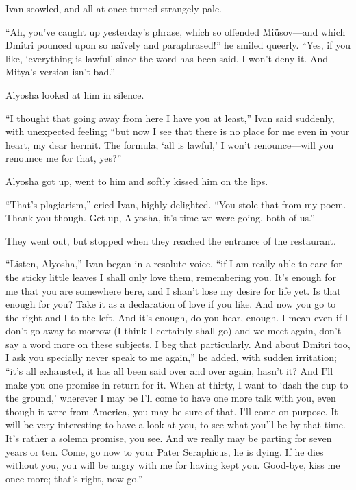 Ivan scowled, and all at once turned strangely pale.

``Ah, you've caught up yesterday's phrase, which so offended
Mi\"{u}sov---and which Dmitri pounced upon so na\"{i}vely and
paraphrased!'' he smiled queerly. ``Yes, if you like, `everything is
lawful' since the word has been said. I won't deny it. And Mitya's
version isn't bad.''

Alyosha looked at him in silence.

``I thought that going away from here I have you at least,'' Ivan said
suddenly, with unexpected feeling; ``but now I see that there is no
place for me even in your heart, my dear hermit. The formula, `all is
lawful,' I won't re\-nounce---will you renounce me for that, yes?''

Alyosha got up, went to him and softly kissed him on the lips.

``That's plagiarism,'' cried Ivan, highly delighted. ``You stole that
from my poem. Thank you though. Get up, Alyosha, it's time we were
going, both of us.''

They went out, but stopped when they reached the entrance of the
restaurant.

``Listen, Alyosha,'' Ivan began in a resolute voice, ``if I am really
able to care for the sticky little leaves I shall only love them,
remembering you. It's enough for me that you are somewhere here, and I
shan't lose my desire for life yet. Is that enough for you? Take it as
a declaration of love if you like. And now you go to the right and I
to the left. And it's enough, do you hear, enough. I mean even if I
don't go away to-morrow (I think I certainly shall go) and we meet
again, don't say a word more on these subjects. I beg that
particularly. And about Dmitri too, I ask you specially never speak to
me again,'' he added, with sudden irritation; ``it's all exhausted, it
has all been said over and over again, hasn't it? And I'll make you
one promise in return for it. When at thirty, I want to `dash the cup
to the ground,' wherever I may be I'll come to have one more talk with
you, even though it were from America,  you may be sure of
that. I'll come on purpose. It will be very interesting to have a look
at you, to see what you'll be by that time. It's rather a solemn
promise, you see. And we really may be parting for seven years or ten.
Come, go now to your Pater Seraphicus, he is dying. If he dies without
you, you will be angry with me for having kept you. Good-bye, kiss me
once more; that's right, now go.''

